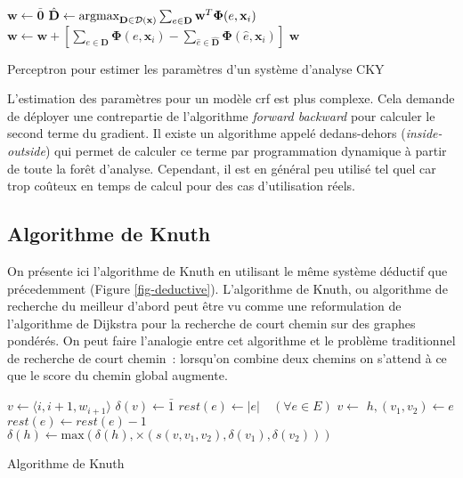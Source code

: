 \documentclass[11pt,openany]{book}
\begin{document}
\begin{algorithm}[htbp]
\begin{algorithmic}[1]
\State $\mathbf{w} \gets \bar{\mathbf{0}}$
\State
$\hat{\mathbf{D}} \gets \mathop{\text{argmax}}_{\mathbf{D}\in
  \mathbf{\cal D}(\mathbf{x})} 
\sum_{e\in \mathbf{D}} \mathbf{w}^T \boldsymbol\Phi(e,\mathbf{x}_i)$
     \State $\mathbf{w} \gets  \mathbf{w} +
     \left[ \sum_{e\in \mathbf{D}} \boldsymbol\Phi(e,\mathbf{x}_i) 
       - \sum_{\hat{e} \in \hat{\mathbf{D}}} \boldsymbol\Phi(\hat{e},\mathbf{x}_i)   \right]$ 
\EndIf
\EndFor
\EndFor
\State \Return $\mathbf{w}$
\EndFunction
\end{algorithmic}
\caption{\label{perceptron-cky}Perceptron pour estimer les paramètres d'un système d'analyse
  CKY}
\end{algorithm}

L'estimation des paramètres pour un modèle {\sc crf} est plus complexe. 
Cela demande de déployer une contrepartie de l'algorithme
{\em forward backward} pour calculer le second terme du gradient. Il existe un algorithme appelé dedans-dehors
({\em inside-outside}) qui permet de calculer ce terme par programmation dynamique à partir de toute la forêt d'analyse. 
Cependant, il est en général peu utilisé tel quel car trop coûteux en temps de calcul pour des cas d'utilisation réels. 



\subsection{Algorithme de Knuth}

On présente ici l'algorithme de Knuth en utilisant le même système déductif que précedemment (Figure \ref{fig-deductive}).
L'algorithme de Knuth, ou algorithme de recherche du meilleur d'abord peut être vu comme
 une reformulation de l'algorithme de Dijkstra pour la recherche de court chemin sur des graphes pondérés.
On peut faire l'analogie entre cet algorithme et le problème traditionnel de recherche de court chemin~:
lorsqu'on combine deux chemins on s'attend à ce que le score du chemin global augmente.


\begin{algorithm}[htbp]
\begin{algorithmic}
\State $v \gets \langle i,i+1,w_{i+1} \rangle$
\State $\delta(v) \gets \bar{1}$
\State  {}
\EndFor
\State   $rest(e) \gets |e| \quad (\forall e \in E)$ 
\State $v \gets $ 
\State $h, (v_1, v_2) \gets e$
\State $rest(e) \gets rest(e) - 1$
\State $\delta(h) \gets \text{max}( \delta(h),  \times(s(v,v_1,v_2),\delta(v_1),\delta(v_2)))$
\State {}
\EndIf
\EndFor
\EndWhile
\EndFunction
\end{algorithmic}
\caption{\label{algo-knuth} Algorithme de Knuth}
\end{algorithm}
\end{document}
